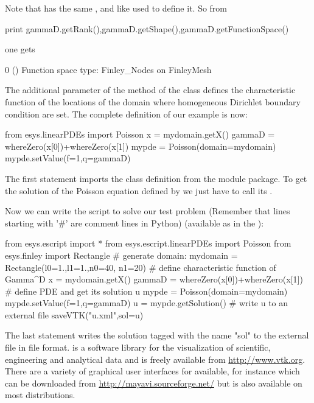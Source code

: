 Note that  has the same \Rank, \Shape and \FunctionSpace like  used to define it. So from 
\begin{python}
print gammaD.getRank(),gammaD.getShape(),gammaD.getFunctionSpace()
\end{python}
one gets 
\begin{python}
0 () Function space type: Finley_Nodes on FinleyMesh 
\end{python}
The additional parameter  of the  method of the \Poisson class defines the 
characteristic function  of the locations
of the domain where homogeneous Dirichlet boundary condition 
are set. The complete definition of our example is now: 
\begin{python}
from esys.linearPDEs import Poisson
x = mydomain.getX()
gammaD = whereZero(x[0])+whereZero(x[1])
mypde = Poisson(domain=mydomain)
mypde.setValue(f=1,q=gammaD)
\end{python}
The first statement imports the \Poisson class definition from the \linearPDEs module \escript package.
To get the solution of the Poisson equation defined by  we just have to call its
. 

Now we can write the script to solve our test problem (Remember that
lines starting with '\#' are comment lines in Python) (available as  
in the \ExampleDirectory):
\begin{python}
from esys.escript import *
from esys.escript.linearPDEs import Poisson
from esys.finley import Rectangle
# generate domain:
mydomain = Rectangle(l0=1.,l1=1.,n0=40, n1=20)
# define characteristic function of Gamma^D
x = mydomain.getX()
gammaD = whereZero(x[0])+whereZero(x[1])
# define PDE and get its solution u
mypde = Poisson(domain=mydomain)
mypde.setValue(f=1,q=gammaD)
u = mypde.getSolution()
# write u to an external file
saveVTK("u.xml",sol=u)
\end{python}
The last statement writes the solution tagged with the name "sol" to the external file  in 
\VTK file format. \VTK is a software library
for the visualization of scientific, engineering and analytical data and is freely available
from \url{http://www.vtk.org}. There are a variety of graphical user interfaces 
for \VTK available, for instance \mayavi which can be downloaded from \url{http://mayavi.sourceforge.net/} but is also available on most
\LINUX distributions.

